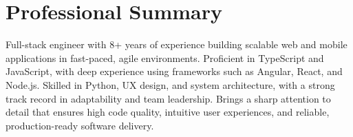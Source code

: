 \vspace{-0.6em}
\section{Professional Summary}
\noindent \normalsize Full-stack engineer with 8+ years of experience building scalable web and mobile applications in fast-paced, agile environments. Proficient in TypeScript and JavaScript, with deep experience using frameworks such as Angular, React, and Node.js. Skilled in Python, UX design, and system architecture, with a strong track record in adaptability and team leadership. Brings a sharp attention to detail that ensures high code quality, intuitive user experiences, and reliable, production-ready software delivery.
\nopagebreak[4]
